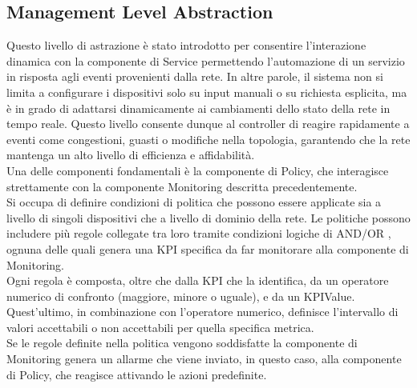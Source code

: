 \subsection{Management Level Abstraction}
Questo livello di astrazione è stato introdotto per consentire l'interazione dinamica con la componente di Service permettendo l'automazione di un servizio in risposta agli eventi provenienti dalla rete.
In altre parole, il sistema non si limita a configurare i dispositivi solo su input manuali o su richiesta esplicita, ma è in grado di adattarsi dinamicamente ai cambiamenti dello stato della rete in tempo reale. 
Questo livello consente dunque al controller di reagire rapidamente a eventi come congestioni, guasti o modifiche nella topologia, garantendo che la rete mantenga un alto livello di efficienza e affidabilità.
\\Una delle componenti fondamentali è la componente di Policy, che interagisce strettamente con la componente Monitoring descritta precedentemente.
\\Si occupa di definire condizioni di politica che possono essere applicate sia a livello di singoli dispositivi che a livello di dominio della rete.
Le politiche possono includere più regole collegate tra loro tramite condizioni logiche di AND/OR \cite{D32}, ognuna delle quali genera una KPI specifica da far monitorare alla componente di Monitoring.
\\Ogni regola è composta, oltre che dalla KPI che la identifica, da un operatore numerico di confronto (maggiore, minore o uguale), e da un KPIValue.
Quest'ultimo, in combinazione con l'operatore numerico, definisce l'intervallo di valori accettabili o non accettabili per quella specifica metrica.
\\Se le regole definite nella politica vengono soddisfatte la componente di Monitoring genera un allarme che viene inviato, in questo caso, alla componente di Policy, che reagisce attivando le azioni predefinite.
